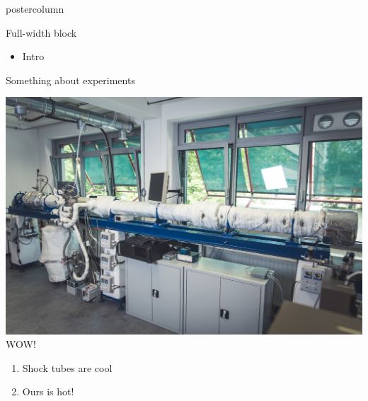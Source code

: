\documentclass[final,hyperref={pdfpagelabels=false}]{beamer}
\begin{document}
\begin{frame}
\begin{columns}
\begin{column}{.98\textwidth}
\begin{beamercolorbox}[center,wd=\textwidth]{postercolumn}
	\begin{block}{\LARGE Full-width block}
		\begin{itemize}
			\item Intro
		\end{itemize}	
	\end{block}
	\vfill
	\begin{block}{\LARGE Something about experiments}
		\begin{multicols}{2}
			\includegraphics[width=0.9\columnwidth]{../figures/PCFC_ST.jpg}
			WOW!
			\columnbreak
			\begin{enumerate}
				\item Shock tubes are cool
				\item Ours is hot!
			\end{enumerate}	
		\end{multicols}
	\end{block}
	\vfill
\end{beamercolorbox}
\end{column}
\end{columns}


\end{frame}
\end{document}
